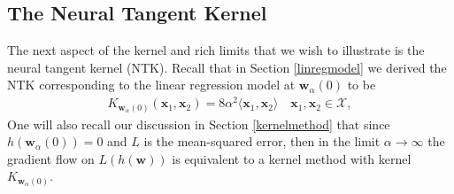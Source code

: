 \documentclass{article}
\begin{document}
\subsection{The Neural Tangent Kernel}\label{visualizeNTK}

The next aspect of the kernel and rich limits that we wish to illustrate is the neural tangent kernel (NTK). Recall that in Section \ref{linregmodel} we derived the NTK corresponding to the linear regression model at $\boldsymbol{w}_{\alpha}(0)$ to be
\begin{align*}
K_{\boldsymbol{w}_{\alpha}(0)}(\boldsymbol{x}_1, \boldsymbol{x}_2) = 8\alpha^2 \langle \boldsymbol{x}_1, \boldsymbol{x}_2 \rangle \quad \boldsymbol{x}_1, \boldsymbol{x}_2 \in \mathcal{X},
\end{align*}
One will also recall our discussion in Section \ref{kernelmethod} that since $h(\boldsymbol{w}_{\alpha}(0)) = 0$ and $L$ is the mean-squared error, then in the limit $\alpha \rightarrow \infty$ the gradient flow on $L(h(\boldsymbol{w}))$ is equivalent to a kernel method with kernel $K_{\boldsymbol{w}_{\alpha}(0)}$. %
\end{document}

